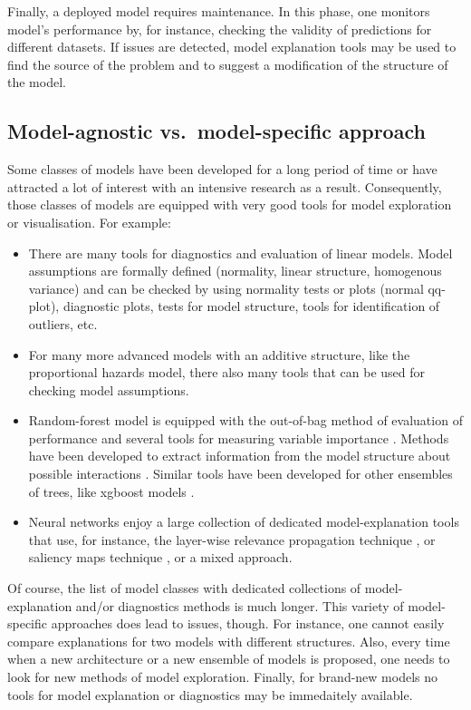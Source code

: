 \documentclass[12pt,]{krantz}
\providecommand{\tightlist}{%
  \setlength{\itemsep}{0pt}\setlength{\parskip}{0pt}}
\theoremstyle{definition}
\theoremstyle{definition}
\theoremstyle{definition}
\theoremstyle{remark}
\begin{document}
Finally, a deployed model requires maintenance. In this phase, one
monitors model's performance by, for instance, checking the validity of
predictions for different datasets. If issues are detected, model
explanation tools may be used to find the source of the problem and to
suggest a modification of the structure of the model.

\hypertarget{model-agnostic-vs.model-specific-approach}{%
\subsection{Model-agnostic vs.~model-specific
approach}\label{model-agnostic-vs.model-specific-approach}}

Some classes of models have been developed for a long period of time or
have attracted a lot of interest with an intensive research as a result.
Consequently, those classes of models are equipped with very good tools
for model exploration or visualisation. For example:

\begin{itemize}
\tightlist
\item
  There are many tools for diagnostics and evaluation of linear models.
  Model assumptions are formally defined (normality, linear structure,
  homogenous variance) and can be checked by using normality tests or
  plots (normal qq-plot), diagnostic plots, tests for model structure,
  tools for identification of outliers, etc.
\item
  For many more advanced models with an additive structure, like the
  proportional hazards model, there also many tools that can be used for
  checking model assumptions.
\item
  Random-forest model is equipped with the out-of-bag method of
  evaluation of performance and several tools for measuring variable
  importance \citep{R-randomForest}. Methods have been developed to
  extract information from the model structure about possible
  interactions \citep{R-randomForestExplainer}. Similar tools have been
  developed for other ensembles of trees, like xgboost models
  \citep{R-xgboostExplainer}.
\item
  Neural networks enjoy a large collection of dedicated
  model-explanation tools that use, for instance, the layer-wise
  relevance propagation technique \citep{BachLWRP}, or saliency maps
  technique \citep{SaliencyMaps}, or a mixed approach.
\end{itemize}

Of course, the list of model classes with dedicated collections of
model-explanation and/or diagnostics methods is much longer. This
variety of model-specific approaches does lead to issues, though. For
instance, one cannot easily compare explanations for two models with
different structures. Also, every time when a new architecture or a new
ensemble of models is proposed, one needs to look for new methods of
model exploration. Finally, for brand-new models no tools for model
explanation or diagnostics may be immedaitely available.
\end{document}
